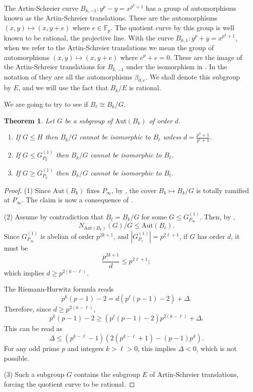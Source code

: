 \documentclass[oneside,a4paper,12pt]{article}
\newcommand{\F}{{\mathbb{F}}}
\theoremstyle{plain} %
\newtheorem{theorem}{Theorem}[section]
\theoremstyle{definition} %
\newcommand{\Aut}{\mathrm{Aut}}
\begin{document}
The Artin-Schreier curve $B_{k,-1}: y^p-y=x^{p^k+1}$ has a group of 
automorphisms known as the Artin-Schreier translations. These
are the automorphisms $(x,y)\mapsto (x,y+e)$ where $e\in \F_p$.
The quotient curve by this group is well known to be rational, the
projective line. 
With the curve $B_{k,1}: y^p+y=x^{p^k+1}$, when we refer to the Artin-Schreier translations we mean the group of automorphisms $(x,y)\mapsto (x,y+e)$ where $e^p+e=0$. These are the image of the Artin-Schreier translations for $B_{k,-1}$
under the isomorphism in .
In the notation of  they are all the automorphisms $\beta_{0,e}$.
We shall denote this subgroup by $E$, and we will use the fact that
$B_k/E$ is rational.



We are going  to try to see if $B_\ell\cong B_k/G$.


\begin{theorem}\label{first_groups}
Let $G$ be a subgroup of $\Aut(B_k)$ of order $d$.
\begin{enumerate}
\item If $G\le H$ then $B_k/G$ cannot be isomorphic to $B_\ell$ unless
$d=\frac{p^k+1}{p^\ell +1}$.
\item If $G\le G^{(1)}_{P_k}$ then $B_k/G$ cannot be isomorphic to $B_\ell$.
\item If $G\ge G^{(1)}_{P_k}$ then $B_k/G$ cannot be isomorphic to $B_\ell$.
\end{enumerate}
\end{theorem}


\begin{proof}
 
(1)
Since $\Aut(B_k)$ fixes $P_{\infty}$, by \cite[Exercise 3.16]{StichBook}, the cover $B_k\mapsto B_k/G$ is totally ramified at $P_{\infty}$. The claim is now a consequence of .


(2)
Assume by contradiction that $B_{\ell}=B_k/G$ for some $G\leq G_{P_{\infty}}^{(1)}$.
Then, by \cite[Exercise 3-4]{milne2022fields}, 
\[
N_{\Aut(B_k)}(G)/G\leq \Aut(B_{\ell}).
\]
Since $ G_{P_{\infty}}^{(1)}$ is abelian of order $p^{2k+1}$, and $|G_{P_\ell}^{(1)}|=p^{2\ell+1}$, if $G$ has order $d$, it must be
\[
\frac{p^{2k+1}}{d}\leq p^{2\ell+1};
\]
which implies $d\geq p^{2(k-\ell)}$.

The Riemann-Hurwitz formula reads
\[
p^k(p-1)-2=d(p^{\ell}(p-1)-2)+\Delta.
\]
Therefore, since $d\geq p^{2(k-\ell)}$,
\[
p^k(p-1)-2\geq(p^{\ell}(p-1)-2)p^{2(k-\ell)}+\Delta.
\]
This can be read as
\[
\Delta\leq (p^{k-\ell}-1)(2(p^{k-\ell}+1)-(p-1)p^k).
\]
For any odd prime $p$ and integers $k>\ell>0$, this implies $\Delta<0$, which is not possible.

(3)
Such a subgroup $G$ contains the subgroup $E$ of Artin-Schreier translations, forcing the quotient curve to be rational.
\end{proof}
\end{document}
